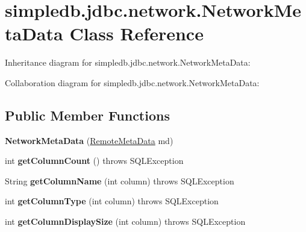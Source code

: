 \hypertarget{classsimpledb_1_1jdbc_1_1network_1_1NetworkMetaData}{}\section{simpledb.\+jdbc.\+network.\+Network\+Meta\+Data Class Reference}
\label{classsimpledb_1_1jdbc_1_1network_1_1NetworkMetaData}


Inheritance diagram for simpledb.\+jdbc.\+network.\+Network\+Meta\+Data\+:


Collaboration diagram for simpledb.\+jdbc.\+network.\+Network\+Meta\+Data\+:
\subsection*{Public Member Functions}
\begin{DoxyCompactItemize}
\item 
\mbox{\label{classsimpledb_1_1jdbc_1_1network_1_1NetworkMetaData_ae23bda3a2c31e2eec4b5200cc1e61d5a}} 
{\bfseries Network\+Meta\+Data} (\hyperlink{interfacesimpledb_1_1jdbc_1_1network_1_1RemoteMetaData}{Remote\+Meta\+Data} md)
\item 
\mbox{\label{classsimpledb_1_1jdbc_1_1network_1_1NetworkMetaData_aed89e1076d7491c84f00960cea63c3b2}} 
int {\bfseries get\+Column\+Count} ()  throws S\+Q\+L\+Exception 
\item 
\mbox{\label{classsimpledb_1_1jdbc_1_1network_1_1NetworkMetaData_adbbc7c63d8b13037ec553f05abc5bdce}} 
String {\bfseries get\+Column\+Name} (int column)  throws S\+Q\+L\+Exception 
\item 
\mbox{\label{classsimpledb_1_1jdbc_1_1network_1_1NetworkMetaData_a9a463770dc904847d98a831b34351c9c}} 
int {\bfseries get\+Column\+Type} (int column)  throws S\+Q\+L\+Exception 
\item 
\mbox{\label{classsimpledb_1_1jdbc_1_1network_1_1NetworkMetaData_aec29dc4176c3edde4279badbb5411af8}} 
int {\bfseries get\+Column\+Display\+Size} (int column)  throws S\+Q\+L\+Exception 
\end{DoxyCompactItemize}


